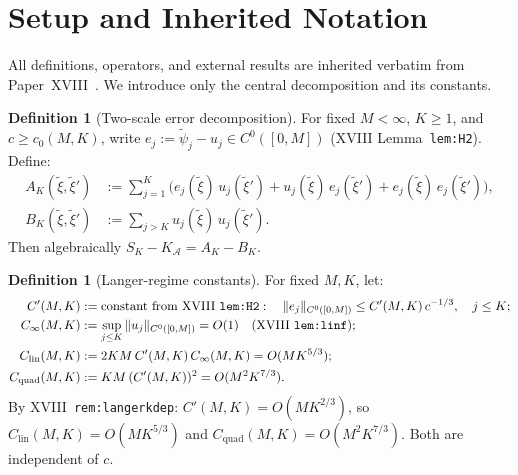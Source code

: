 \documentclass[12pt,a4paper]{amsart}
\theoremstyle{definition}
\newtheorem{definition}[theorem]{Definition}
\newcommand{\cA}{\mathcal{A}}
\newcommand{\cKA}{K_{\cA}}
\newcommand{\xit}{\tilde{\xi}}
\newcommand{\normh}[2]{\|#1\|_{#2}}
\newcommand{\SK}{S_K}
\newcommand{\Cprime}{C'(M,K)}
\newcommand{\Clin}{C_{\mathrm{lin}}(M,K)}
\newcommand{\Cquad}{C_{\mathrm{quad}}(M,K)}
\newcommand{\AK}{A_K}
\newcommand{\BK}{B_K}
\newcommand{\Cinfty}{C_\infty(M,K)}
\begin{document}
\section{Setup and Inherited Notation}
\label{sec:setup}

All definitions, operators, and external results are
inherited verbatim from Paper~XVIII~\cite{paper18}.
We introduce only the central decomposition and its constants.

\begin{definition}[Two-scale error decomposition]
\label{def:decomp}
For fixed $M < \infty$, $K \geq 1$, and $c \geq c_0(M,K)$, write
$e_j := \tilde\psi_j - u_j \in C^0([0,M])$
(XVIII Lemma~\texttt{lem:H2}). Define:
\begin{align}
  \AK(\xit,\xit') &:=
    \sum_{j=1}^K\bigl(
      e_j(\xit)\,u_j(\xit') + u_j(\xit)\,e_j(\xit') + e_j(\xit)\,e_j(\xit')
    \bigr),
    \label{eq:AK} \\
  \BK(\xit,\xit') &:= \sum_{j>K} u_j(\xit)\,u_j(\xit').
    \label{eq:BK}
\end{align}
Then algebraically $\SK - \cKA = \AK - \BK$.
\end{definition}

\begin{definition}[Langer-regime constants]
\label{def:langerconstants}
For fixed $M,K$, let:
\begin{align}
  \Cprime &:= \text{constant from XVIII~\texttt{lem:H2}}:
    \quad\normh{e_j}{C^0([0,M])} \leq \Cprime\,c^{-1/3},
    \quad j\leq K; \label{eq:Cprime}\\
  \Cinfty &:= \sup_{j\leq K}\normh{u_j}{C^0([0,M])}
    = O(1) \quad\text{(XVIII~\texttt{lem:linf})}; \label{eq:Cinfty}\\
  \Clin   &:= 2KM\,\Cprime\,\Cinfty
    = O(MK^{5/3}); \label{eq:Clin} \\
  \Cquad  &:= KM\,(\Cprime)^2
    = O(M^2K^{7/3}). \label{eq:Cquad}
\end{align}
By XVIII~\texttt{rem:langerkdep}: $\Cprime = O(MK^{2/3})$,
so $\Clin = O(MK^{5/3})$ and $\Cquad = O(M^2K^{7/3})$.
Both are independent of $c$.
\end{definition}
\end{document}
